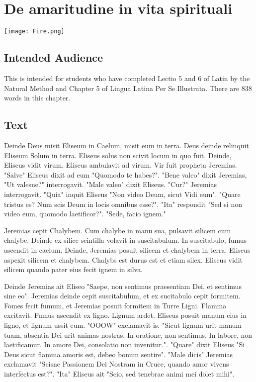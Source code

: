 \chapter{De amaritudine in vita spirituali}
\begin{center}
\texttt{[image: Fire.png]}
\end{center}

\section{Intended Audience}
This is intended for students who have completed Lectio 5 and 6 of Latin by the Natural Method and Chapter 5 of Lingua Latina Per Se Illustrata. There are 838 words in this chapter.

\section{Text}
Deinde Deus misit Eliseum in Caelum, misit eum in terra. Deus deinde relinquit Eliseum Solum in terra. Eliseus solus non scivit locum in quo fuit. Deinde, Eliseus vidit virum. Eliseus ambulavit ad virum. Vir fuit propheta Jeremias. "Salve" Eliseus dixit ad eum "Quomodo te habes?". "Bene valeo" dixit Jeremias, "Ut valesne?" interrogavit. "Male valeo" dixit Eliseus. "Cur?" Jeremias interrogavit. "Quia" inquit Eliseus "Non video Deum, sicut Vidi eum". "Quare tristus es? Num scis Deum in locis omnibus esse?". "Ita" respondit "Sed si non video eum, quomodo laetificor?". "Sede, facio ignem." \par 
Jeremias cepit Chalybem. Cum chalybe in manu sua, pulsavit silicem cum chalybe. Deinde ex silice scintilla volavit in suscitabulum. In suscitabulo, fumus ascendit in caelum. Deinde, Jeremias posuit silicem et chalybem in terra. Eliseus aspexit silicem et chalybem. Chalybs est durus est et etiam silex. Eliseus vidit silicem quando pater eius fecit ignem in silva. \par
Deinde Jeremias ait Eliseo "Saepe, non sentimus praesentiam Dei, et sentimus sine eo". Jeremias deinde cepit suscitabulum, et ex sucitabulo cepit formitem. Fomes fecit fumum, et Jeremias posuit formitem in Turre Ligni. Flamma excitavit. Fumus ascendit ex ligno. Lignum ardet. Eliseus posuit manum eius in ligno, et lignum ussit eum. "OOOW" exclamavit is. "Sicut lignum urit manum tuam, absentia Dei urit animas nostras. In oratione, non sentimus. In labore, non laetificamur. In amore Dei, consolatio non invenitur.". "Quare" dixit Eliseus "Si Deus sicut flamma amoris est, debeo bonum sentire". "Male dicis" Jeremias exclamavit "Scisne Passionem Dei Nostram in Cruce, quando amor vivens interfectus est?". "Ita" Eliseus ait "Scio, sed tenebrae animi mei dolet mihi". \par

